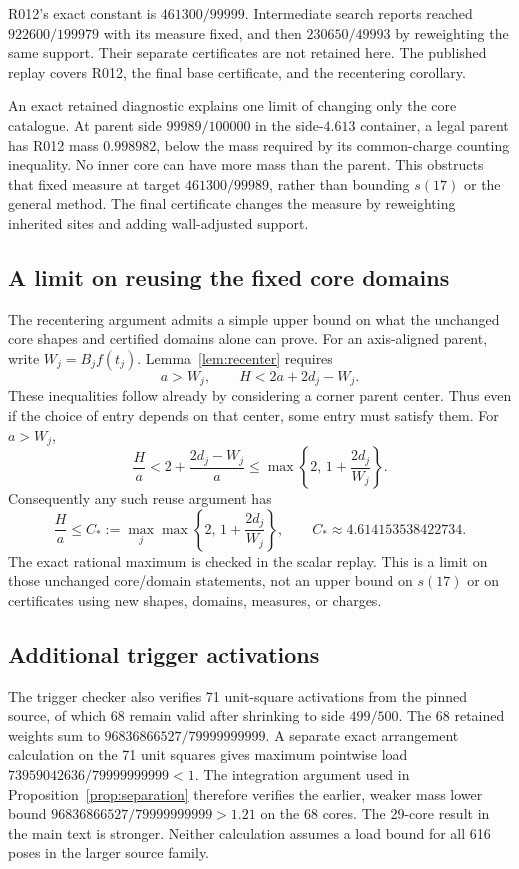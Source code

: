 \documentclass[11pt]{article}
\begin{document}
R012's exact constant is $461300/99999$. Intermediate search reports reached
$922600/199979$ with its measure fixed, and then $230650/49993$ by reweighting
the same support. Their separate certificates are not retained here. The
published replay covers R012, the final base certificate, and the recentering
corollary.

An exact retained diagnostic explains one limit of changing only the core
catalogue. At parent side $99989/100000$ in the side-$4.613$ container, a legal
parent has R012 mass $0.998982$, below the mass required by its common-charge
counting inequality. No inner core can have more mass than the parent. This
obstructs that fixed measure at target $461300/99989$, rather than bounding
$s(17)$ or the general method. The final certificate changes the measure by
reweighting inherited sites and adding wall-adjusted support.

\subsection{A limit on reusing the fixed core domains}\label{app:cap}

The recentering argument admits a simple upper bound on what the unchanged
core shapes and certified domains alone can prove. For an axis-aligned parent,
write $W_j=B_jf(t_j)$. Lemma~\ref{lem:recenter} requires
\[
  a>W_j,\qquad H<2a+2d_j-W_j.
\]
These inequalities follow already by considering a corner parent center.
Thus even if the choice of entry depends on that center, some entry must
satisfy them. For $a>W_j$,
\[
  \frac Ha<2+\frac{2d_j-W_j}{a}
  \le\max\left\{2,\,1+\frac{2d_j}{W_j}\right\}.
\]
Consequently any such reuse argument has
\[
  \frac Ha\le C_*:=\max_j\max\left\{2,\,1+\frac{2d_j}{W_j}\right\},
  \qquad C_*\approx4.614153538422734.
\]
The exact rational maximum is checked in the scalar replay. This is a limit
on those unchanged core/domain statements, not an upper bound on $s(17)$ or
on certificates using new shapes, domains, measures, or charges.

\subsection{Additional trigger activations}

The trigger checker also verifies 71 unit-square activations from the pinned
source, of which 68 remain valid after shrinking to side $499/500$. The
68 retained weights sum to $96836866527/79999999999$. A separate exact
arrangement calculation on the 71 unit squares gives maximum pointwise load
$73959042636/79999999999<1$. The integration argument used in
Proposition~\ref{prop:separation} therefore verifies the earlier, weaker
mass lower bound $96836866527/79999999999>1.21$ on the 68 cores. The 29-core
result in the main text is stronger. Neither calculation assumes a load
bound for all 616 poses in the larger source family.
\end{document}
